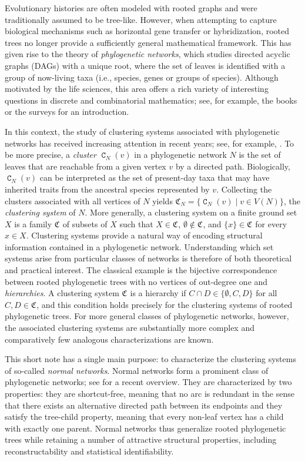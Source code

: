 \documentclass[preprint]{elsarticle}
\newcommand{\CS}[1][]{\ensuremath{\mathfrak{C}_{#1}}}
\DeclareMathOperator{\CC}{\mathtt{C}}
\begin{document}
Evolutionary histories are often modeled with rooted graphs and were traditionally assumed to be
tree-like. However, when attempting to capture biological mechanisms such as horizontal gene
transfer or hybridization, rooted trees no longer provide a sufficiently general mathematical
framework. This has given rise to the theory of \emph{phylogenetic networks}, which studies directed
acyclic graphs (DAGs) with a unique root, where the set of leaves is identified with a group of
now-living taxa (i.e., species, genes or groups of species). Although motivated by the life
sciences, this area offers a rich variety of interesting questions in discrete and combinatorial
mathematics; see, for example, the books \cite{Dress:2011,Huson:2010} or the surveys
\cite{Huson:2011,Linz:2026} for an introduction.

In this context, the study of clustering systems associated with phylogenetic networks has received
increasing attention in recent years; see, for example,
\cite{Hellmuth:2023,Dai:2026,Barthelemy:08,Brucker:09,Bertrand:14,ALRR:14,Changat:2025,Nakhleh:05}.
To be more precise, a \emph{cluster} $\CC_N(v)$ in a phylogenetic network $N$ is the set of leaves
that are reachable from a given vertex $v$ by a directed path. Biologically, $\CC_N(v)$ can be
interpreted as the set of present-day taxa that may have inherited traits from the ancestral species
represented by $v$. Collecting the clusters associated with all vertices of $N$ yields
$\CS[N]=\{\CC_N(v)\mid v\in V(N)\}$, the \emph{clustering system} of $N$. More generally, a clustering
system on a finite ground set $X$ is a family $\CS$ of subsets of $X$ such that $X\in\CS$,
$\emptyset\notin\CS$, and $\{x\}\in\CS$ for every $x\in X$. Clustering systems provide a natural way
of encoding structural information contained in a phylogenetic network. Understanding which set
systems arise from particular classes of networks is therefore of both theoretical and practical
interest. The classical example is the bijective correspondence between rooted phylogenetic trees
with no vertices of out-degree one and \emph{hierarchies}. A clustering system $\CS$ is a hierarchy
if $ C\cap D\in\{\emptyset,C,D\} $ for all $C,D\in\CS$, and this condition holds precisely for the
clustering systems of rooted phylogenetic trees. For more general classes of phylogenetic networks,
however, the associated clustering systems are substantially more complex and comparatively few
analogous characterizations are known. 

This short note has a single main purpose: to characterize the clustering systems of so-called
\emph{normal networks}. Normal networks \cite{Willson:2010} form a prominent class of phylogenetic
networks; see \cite{Francis:2025} for a recent overview. They are characterized by two properties:
they are shortcut-free, meaning that no arc is redundant in the sense that there exists an
alternative directed path between its endpoints and they satisfy the tree-child property, meaning
that every non-leaf vertex has a child with exactly one parent. Normal networks thus generalize
rooted phylogenetic trees while retaining a number of attractive structural properties, including
reconstructability and statistical identifiability.
\end{document}
